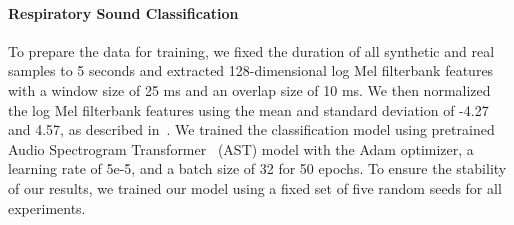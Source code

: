 \documentclass{article}
\begin{document}
\paragraph{Respiratory Sound Classification} To prepare the data for training, we fixed the duration of all synthetic and real samples to 5 seconds and extracted 128-dimensional log Mel filterbank features with a window size of 25 ms and an overlap size of 10 ms. We then normalized the log Mel filterbank features using the mean and standard deviation of -4.27 and 4.57, as described in~\cite{bae23b_interspeech}. We trained the classification model using pretrained Audio Spectrogram Transformer~\cite{gong21b_interspeech} (AST) model with the Adam optimizer, a learning rate of 5e-5, and a batch size of 32 for 50 epochs. To ensure the stability of our results, we trained our model using a fixed set of five random seeds for all experiments. 










\begin{table}[!t]
    \centering
    \caption{Respiratory sound classification performance on ICBHI test set according to various mixed sample amounts using the AST~\cite{gong21b_interspeech} fine-tuning as described in~\cite{bae23b_interspeech}. No Aug. denotes only the real ICBHI dataset is used for training. We only report the ICBHI \emph{Score} (\%). \textbf{Bold} denotes the best result.}\label{tab:table1}
\addtolength{\tabcolsep}{0pt}
\end{table} 
\end{document}
